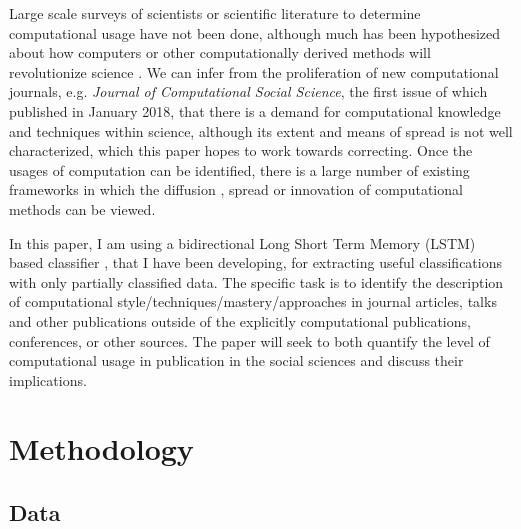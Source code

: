 \documentclass[12pt, a4paper]{article}
\begin{document}
Large scale surveys of scientists or scientific literature to determine computational usage have not been done, although much has been hypothesized about how computers or other computationally derived methods will revolutionize science \citep[e.g.][]{de1997computer, anderson2008end,  provost2013data, john2014big}. We can infer from the proliferation of new computational journals, e.g. \textit{Journal of Computational Social Science}, the first issue of which published in January 2018, that there is a demand for computational knowledge and techniques within science, although its extent and means of spread is not well characterized, which this paper hopes to work towards correcting. Once the usages of computation can be identified, there is a large number of existing frameworks in which the diffusion \citep{griliches1960hybrid}, spread \citep{padgett1993robust} or innovation \citep{foster2015tradition} of computational methods can be viewed.

In this paper, I am using a bidirectional Long Short Term Memory (LSTM) based classifier \cite{graves2005framewise}, that I have been developing, for extracting useful classifications with only partially classified data. The specific task is to identify the description of computational style/techniques/mastery/approaches in journal articles, talks and other publications outside of the explicitly computational publications, conferences, or other sources. The paper will seek to both quantify the level of computational usage in publication in the social sciences and discuss their implications.


\section{Methodology}

\subsection{Data}
\end{document}
